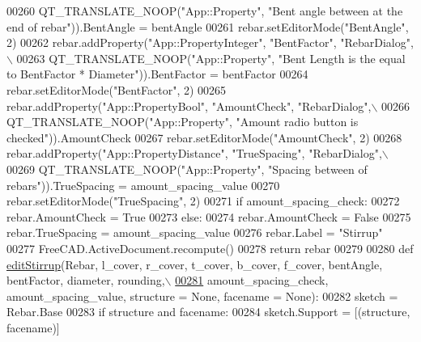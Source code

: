 \begin{DoxyCode}
00260         QT\_TRANSLATE\_NOOP(\textcolor{stringliteral}{"App::Property"}, \textcolor{stringliteral}{"Bent angle between at the end of rebar"})).BentAngle = bentAngle
00261     rebar.setEditorMode(\textcolor{stringliteral}{"BentAngle"}, 2)
00262     rebar.addProperty(\textcolor{stringliteral}{"App::PropertyInteger"}, \textcolor{stringliteral}{"BentFactor"}, \textcolor{stringliteral}{"RebarDialog"},\(\backslash\)
00263         QT\_TRANSLATE\_NOOP(\textcolor{stringliteral}{"App::Property"}, \textcolor{stringliteral}{"Bent Length is the equal to BentFactor * Diameter"})).BentFactor
       = bentFactor
00264     rebar.setEditorMode(\textcolor{stringliteral}{"BentFactor"}, 2)
00265     rebar.addProperty(\textcolor{stringliteral}{"App::PropertyBool"}, \textcolor{stringliteral}{"AmountCheck"}, \textcolor{stringliteral}{"RebarDialog"},\(\backslash\)
00266         QT\_TRANSLATE\_NOOP(\textcolor{stringliteral}{"App::Property"}, \textcolor{stringliteral}{"Amount radio button is checked"})).AmountCheck
00267     rebar.setEditorMode(\textcolor{stringliteral}{"AmountCheck"}, 2)
00268     rebar.addProperty(\textcolor{stringliteral}{"App::PropertyDistance"}, \textcolor{stringliteral}{"TrueSpacing"}, \textcolor{stringliteral}{"RebarDialog"},\(\backslash\)
00269         QT\_TRANSLATE\_NOOP(\textcolor{stringliteral}{"App::Property"}, \textcolor{stringliteral}{"Spacing between of rebars"})).TrueSpacing = amount\_spacing\_value
00270     rebar.setEditorMode(\textcolor{stringliteral}{"TrueSpacing"}, 2)
00271     \textcolor{keywordflow}{if} amount\_spacing\_check:
00272         rebar.AmountCheck = \textcolor{keyword}{True}
00273     \textcolor{keywordflow}{else}:
00274         rebar.AmountCheck = \textcolor{keyword}{False}
00275         rebar.TrueSpacing = amount\_spacing\_value
00276     rebar.Label = \textcolor{stringliteral}{"Stirrup"}
00277     FreeCAD.ActiveDocument.recompute()
00278     \textcolor{keywordflow}{return} rebar
00279 
00280 \textcolor{keyword}{def }\hyperlink{namespaceStirrup_a1f6d278ace7fe116895dba342e2a3573}{editStirrup}(Rebar, l\_cover, r\_cover, t\_cover, b\_cover, f\_cover, bentAngle, bentFactor, 
      diameter, rounding,\(\backslash\)
\hypertarget{Stirrup_8py_source.tex_l00281}{}\hyperlink{namespaceStirrup_a1f6d278ace7fe116895dba342e2a3573}{00281}         amount\_spacing\_check, amount\_spacing\_value, structure = \textcolor{keywordtype}{None}, facename = \textcolor{keywordtype}{None}):
00282     sketch = Rebar.Base
00283     \textcolor{keywordflow}{if} structure \textcolor{keywordflow}{and} facename:
00284         sketch.Support = [(structure, facename)]

\end{DoxyCode}
